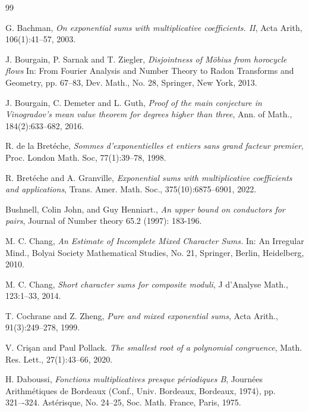 \documentclass[12pt]{amsart}
\begin{document}
\begin{thebibliography}{99}

G. Bachman, {\it On  exponential  sums  with  multiplicative coefficients.  II}, Acta Arith, 106(1):41--57, 2003.



J. Bourgain, P. Sarnak  and T. Ziegler, {\it Disjointness of Möbius from horocycle flows}  In: From Fourier Analysis and Number Theory to Radon Transforms and Geometry, pp. 67--83, Dev. Math., No. 28, Springer, New York, 2013. 


J. Bourgain, C. Demeter and L. Guth, 
\textit{Proof of the main conjecture in Vinogradov's mean value theorem for degrees higher than three},
Ann. of Math., 184(2):633--682, 2016. 

R. de la Bret\'{e}che, {\it Sommes d’exponentielles et entiers sans grand facteur premier}, Proc. London
Math. Soc, 77(1):39--78, 1998.

R. Bret\'{e}che and A. Granville, {\it Exponential sums with multiplicative coefficients and applications}, Trans. Amer. Math. Soc., 375(10):6875--6901, 2022.

Bushnell, Colin John, and Guy Henniart., {\it An upper bound on conductors for pairs},  Journal of Number theory 65.2 (1997): 183-196.


M. C. Chang, {\it An Estimate of Incomplete Mixed Character Sums.} In: An Irregular Mind., Bolyai Society Mathematical Studies, No. 21, Springer, Berlin, Heidelberg, 2010.

M. C. Chang, {\it Short character sums for composite moduli}, J d'Analyse Math., 123:1--33, 2014.

T. Cochrane and Z. Zheng, {\it Pure and mixed exponential sums}, Acta Arith., 91(3):249--278, 1999. 

V. Crişan and Paul Pollack. \textit{The smallest root of a polynomial congruence}, Math. Res. Lett., 27(1):43--66, 2020.




H. Daboussi, 
\textit{Fonctions multiplicatives presque p\'{e}riodiques {B}},
Journées Arithmétiques de Bordeaux (Conf., Univ. Bordeaux, Bordeaux, 1974), pp. 321–-324. Astérisque, No. 24–25, Soc. Math. France, Paris, 1975.


\end{thebibliography}
\end{document}
